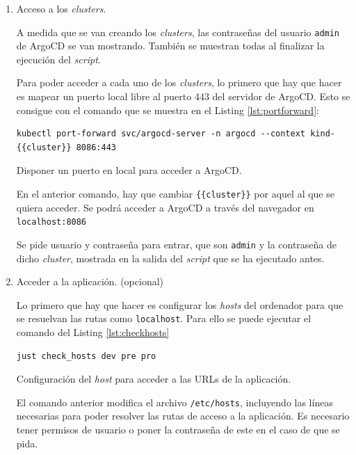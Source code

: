 \begin{enumerate}
  \item Acceso a los \textit{clusters}.

    A medida que se van creando los \textit{clusters}, las contraseñas del usuario \texttt{admin} de ArgoCD se van mostrando. También se muestran todas al finalizar la ejecución del \textit{script}.

    Para poder acceder a cada uno de los \textit{clusters}, lo primero que hay que hacer es mapear un puerto local libre al puerto 443 del servidor de ArgoCD. Esto se consigue con el comando que se muestra en el Listing \ref{lst:portforward}:

\begin{listing}[!ht]
  \begin{verbatim}
kubectl port-forward svc/argocd-server -n argocd --context kind-{{cluster}} 8086:443
\end{verbatim}
\caption{Disponer un puerto en local para acceder a ArgoCD.}
\label{lst:portforward}
\end{listing}

    En el anterior comando, hay que cambiar \texttt{\{\{cluster\}\}} por aquel al que se quiera acceder. Se podrá acceder a ArgoCD a través del navegador en \texttt{localhost:8086}

    Se pide usuario y contraseña para entrar, que son \texttt{admin} y la contraseña de dicho \textit{cluster}, mostrada en la salida del \textit{script} que se ha ejecutado antes.

  \item Acceder a la aplicación. (opcional)

    Lo primero que hay que hacer es configurar los \textit{hosts} del ordenador para que se resuelvan las rutas como \texttt{localhost}. Para ello se puede ejecutar el comando del Listing \ref{lst:checkhosts}

\begin{listing}[!ht]
  \begin{verbatim}
just check_hosts dev pre pro
\end{verbatim}
\caption{Configuración del \textit{host} para acceder a las URLs de la aplicación.}
\label{lst:checkhosts}
\end{listing}

    El comando anterior modifica el archivo \texttt{/etc/hosts}, incluyendo las líneas necesarias para poder resolver las rutas de acceso a la aplicación. Es necesario tener permisos de usuario o poner la contraseña de este en el caso de que se pida.


\end{enumerate}
